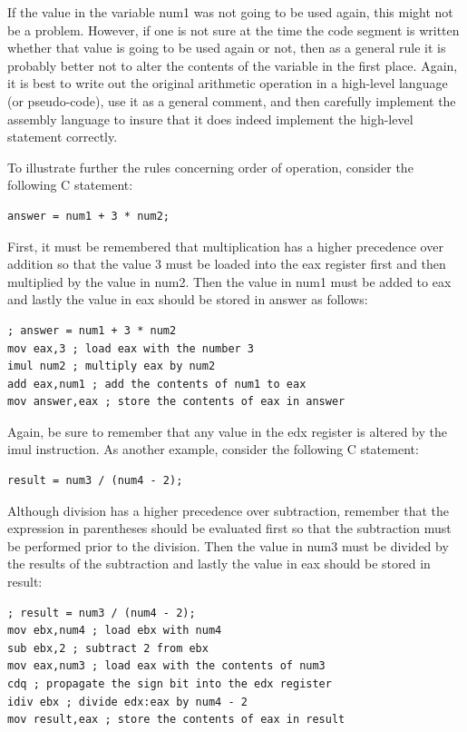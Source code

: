 \documentclass[10pt]{book}
\begin{document}
If the value in the variable num1 was not going to be used again, this might not be a problem. However, if one is not sure at the time the code segment is written whether that value is going to be used again or not, then as a general rule it is probably better not to alter the contents of the variable in the first place. Again, it is best to write out the original arithmetic operation in a high-level language (or pseudo-code), use it as a general comment, and then carefully implement the assembly language to insure that it does indeed implement the high-level statement correctly.

To illustrate further the rules concerning order of operation, consider the following C statement:
\begin{verbatim}
answer = num1 + 3 * num2;
\end{verbatim}

First, it must be remembered that multiplication has a higher precedence over addition so that the value 3 must be loaded into the eax register first and then multiplied by the value in num2. Then the value in num1 must be added to eax and lastly the value in eax should be stored in answer as follows:

\begin{verbatim}
; answer = num1 + 3 * num2
mov eax,3 ; load eax with the number 3
imul num2 ; multiply eax by num2
add eax,num1 ; add the contents of num1 to eax
mov answer,eax ; store the contents of eax in answer
\end{verbatim}

Again, be sure to remember that any value in the edx register is altered by the imul instruction. As another example, consider the following C statement:

\begin{verbatim}
result = num3 / (num4 - 2);
\end{verbatim}

Although division has a higher precedence over subtraction, remember that the expression in parentheses should be evaluated first so that the subtraction must be performed prior to the division. Then the value in num3 must be divided by the results of the subtraction and lastly the value in eax should be stored in result:

\begin{verbatim}
; result = num3 / (num4 - 2);
mov ebx,num4 ; load ebx with num4
sub ebx,2 ; subtract 2 from ebx
mov eax,num3 ; load eax with the contents of num3
cdq ; propagate the sign bit into the edx register
idiv ebx ; divide edx:eax by num4 - 2
mov result,eax ; store the contents of eax in result
\end{verbatim}
\end{document}
